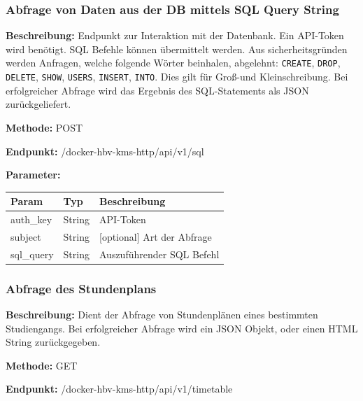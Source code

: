 \subsubsection{Abfrage von Daten aus der DB mittels SQL Query String}
\label{sec:api-sql-query}
\textbf{Beschreibung:} Endpunkt zur Interaktion mit der Datenbank. Ein API-Token wird benötigt. SQL Befehle können übermittelt werden. Aus sicherheitsgründen werden Anfragen, welche folgende Wörter beinhalen, abgelehnt: \verb|CREATE|, \verb|DROP|, \verb|DELETE|, \verb|SHOW|, \verb|USERS|, \verb|INSERT|, \verb|INTO|. Dies gilt für Groß-und Kleinschreibung. Bei erfolgreicher Abfrage wird das Ergebnis des SQL-Statements als JSON zurückgeliefert.

\textbf{Methode:} POST

\textbf{Endpunkt:} /docker-hbv-kms-http/api/v1/sql

\textbf{Parameter:}
\begin{table}[H]
    \label{table:/docker-hbv-kms-http/api/v1/sql}
    \setlength{\tabcolsep}{3pt}
    \begin{tabular}{p{100pt}p{80pt}p{200pt}}
        \toprule
        Param      & Typ    & Beschreibung               \\
        \midrule
        auth\_key  & String & API-Token                  \\
        subject    & String & [optional] Art der Abfrage \\
        sql\_query & String & Auszuführender SQL Befehl  \\
        \bottomrule
    \end{tabular}
\end{table}
\dotfill

\subsubsection{Abfrage des Stundenplans}
\label{sec:api-timetable}
\textbf{Beschreibung:} Dient der Abfrage von Stundenplänen eines bestimmten Studiengangs. Bei erfolgreicher Abfrage wird ein JSON Objekt, oder einen HTML String zurückgegeben.

\textbf{Methode:} GET

\textbf{Endpunkt:} /docker-hbv-kms-http/api/v1/timetable

